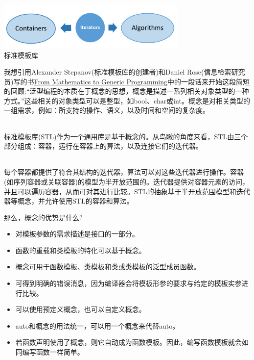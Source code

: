 \begin{center}
\includegraphics[width=0.7\textwidth]{content/3/chapter4/images/6.png}\\
标准模板库
\end{center}

\begin{tcolorbox}[colback=blue!5!white,colframe=blue!75!black,title={泛型编程的本质}]
我想引用Alexander Stepanov(标准模板库的创建者)和Daniel Rose(信息检索研究员)写的书\href{https://www.fm2gp.com/}{From Mathematics to Generic Programming}中的一段话来开始这段简短的回顾:“泛型编程的本质在于概念的思想，概念是描述一系列相关对象类型的一种方式。”这些相关的对象类型可以是整型，如bool、char或int。概念是对相关类型的一组需求，例如：所支持的操作、语义，以及时间和空间的复杂度。

\hspace*{\fill} \\ %
标准模板库(STL)作为一个通用库是基于概念的。从鸟瞰的角度来看，STL由三个部分组成：容器，运行在容器上的算法，以及连接它们的迭代器。

\hspace*{\fill} \\ %
每个容器都提供了符合其结构的迭代器，算法可以对这些迭代器进行操作。容器(如序列容器或关联容器)的模型为半开放范围的。迭代器提供对容器元素的访问，并且可以遍历容器，从而可对其进行比较。STL的抽象基于半开放范围模型和迭代器等概念，并允许使用STL的容器和算法。
\end{tcolorbox}

那么，概念的优势是什么?


\begin{itemize}
\item 
对模板参数的需求描述是接口的一部分。

\item 
函数的重载和类模板的特化可以基于概念。

\item 
概念可用于函数模板、类模板和类或类模板的泛型成员函数。

\item 
可得到明确的错误消息，因为编译器会将模板形参的要求与给定的模板实参进行比较。

\item 
可以使用预定义概念，也可以自定义概念。

\item 
auto和概念的用法统一，可以用一个概念来代替auto。

\item 
若函数声明使用了概念，则它自动成为函数模板。因此，编写函数模板就会如同编写函数一样简单。
\end{itemize}


